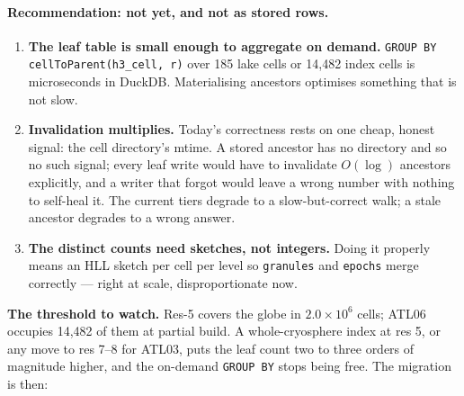 \documentclass[11pt,a4paper]{article}
\newcommand{\code}[1]{\texttt{\small #1}}
\newcommand{\col}[1]{\texttt{\footnotesize #1}}
\begin{document}
\paragraph{Recommendation: not yet, and not as stored rows.}
\begin{enumerate}\setlength{\itemsep}{3pt}
\item \textbf{The leaf table is small enough to aggregate on demand.} \code{GROUP BY
  cellToParent(h3\_cell, r)} over 185 lake cells or 14{,}482 index cells is microseconds in DuckDB.
  Materialising ancestors optimises something that is not slow.
\item \textbf{Invalidation multiplies.} Today's correctness rests on one cheap, honest signal: the cell
  directory's mtime. A stored ancestor has no directory and so no such signal; every leaf write would have to
  invalidate $O(\log)$ ancestors explicitly, and a writer that forgot would leave a wrong number with nothing
  to self-heal it. The current tiers degrade to a slow-but-correct walk; a stale ancestor degrades to a wrong
  answer.
\item \textbf{The distinct counts need sketches, not integers.} Doing it properly means an HLL sketch per
  cell per level so \code{granules} and \code{epochs} merge correctly --- right at scale, disproportionate now.
\end{enumerate}

\noindent
\textbf{The threshold to watch.} Res-5 covers the globe in $2.0\times10^{6}$ cells; ATL06 occupies 14{,}482
of them at partial build. A whole-cryosphere index at res 5, or any move to res 7--8 for ATL03, puts the leaf
count two to three orders of magnitude higher, and the on-demand \code{GROUP BY} stops being free. The
migration is then:

\begin{center}
\end{center}
\end{document}
